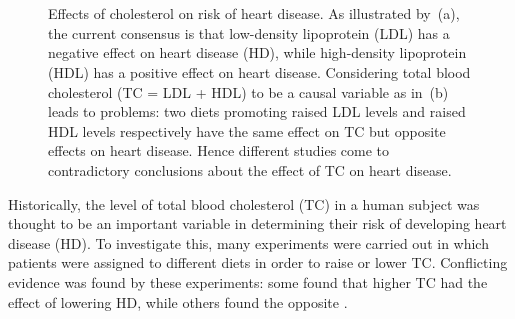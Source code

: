 \begin{figure}
	\begin{subfigure}{.45\linewidth}
		\center\
		\caption{}\label{fig:cholesterol:a}
	\end{subfigure}
	\hfill
	\begin{subfigure}{.45\linewidth}
		\center\
		\caption{}\label{fig:cholesterol:b}
	\end{subfigure}
	\caption{Effects of cholesterol on risk of heart disease. As illustrated by~(a), the current consensus is that low-density lipoprotein (LDL) has a negative effect on heart disease (HD), while high-density lipoprotein (HDL) has a positive effect on heart disease. Considering total blood cholesterol (TC = LDL + HDL) to be a causal variable as in~(b) leads to problems: two diets promoting raised LDL levels and raised HDL levels respectively have the same effect on TC but opposite effects on heart disease. Hence different studies come to contradictory conclusions about the effect of TC on heart disease.}
	\label{fig:cholesterol}
\end{figure}




Historically, the level of total blood cholesterol (TC) in a human subject was thought to be an important variable in determining their risk of developing heart disease (HD).
To investigate this, many experiments were carried out in which patients were assigned to different diets in order to raise or lower TC\@.
Conflicting evidence was found by these experiments: some found that higher TC had the effect of lowering HD, while others found the opposite \citep{truswell2010cholesterol,steinberg2011cholesterol}.


